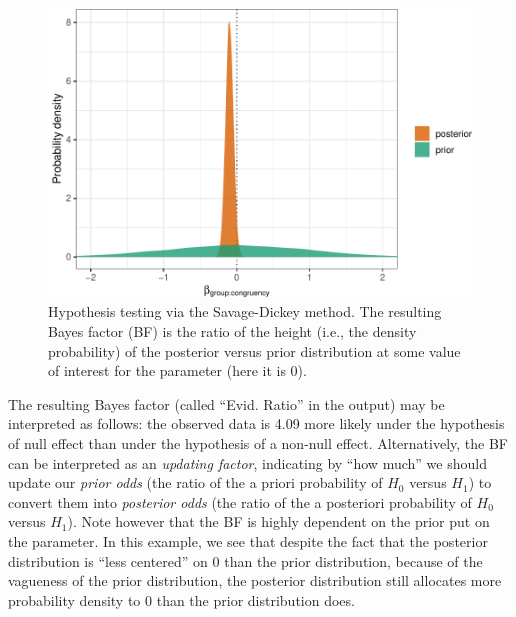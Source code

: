 \documentclass[
  11pt,
  english,
  ,doc,floatsintext]{apa6}
\begin{document}
\begin{figure}[!htb]

{\centering \includegraphics[width=0.75\linewidth]{supplementary_materials_files/figure-latex/hypothesis1-1} 

}

\caption{Hypothesis testing via the Savage-Dickey method. The resulting Bayes factor (BF) is the ratio of the height (i.e., the density probability) of the posterior versus prior distribution at some value of interest for the parameter (here it is 0).}\label{fig:hypothesis1}
\end{figure}

The resulting Bayes factor (called \enquote{Evid. Ratio} in the output) may be interpreted as follows: the observed data is 4.09 more likely under the hypothesis of null effect than under the hypothesis of a non-null effect. Alternatively, the BF can be interpreted as an \emph{updating factor}, indicating by \enquote{how much} we should update our \emph{prior odds} (the ratio of the a priori probability of \(H_{0}\) versus \(H_{1}\)) to convert them into \emph{posterior odds} (the ratio of the a posteriori probability of \(H_{0}\) versus \(H_{1}\)). Note however that the BF is highly dependent on the prior put on the parameter. In this example, we see that despite the fact that the posterior distribution is \enquote{less centered} on 0 than the prior distribution, because of the vagueness of the prior distribution, the posterior distribution still allocates more probability density to 0 than the prior distribution does.
\end{document}
